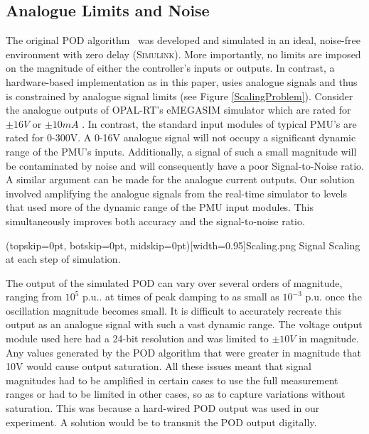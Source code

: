 \documentclass{ieeeaccess}
\begin{document}
\subsection{Analogue Limits and Noise}
The original POD algorithm~\cite{PhasorPOD} was developed and simulated in an ideal, noise-free environment with zero delay (\textsc{Simulink}). More importantly, no limits are imposed on the magnitude of either the controller's inputs or outputs. In contrast, a hardware-based implementation as in this paper, usies analogue signals and thus is constrained by analogue signal limits (see Figure \ref{ScalingProblem}). Consider the analogue outputs of OPAL-RT's eMEGASIM simulator which are rated for $\pm16V$ or $\pm10mA$  \cite{eMEGASIM}. In contrast, the standard input modules of typical PMU's are rated for 0-300V. A 0-16V analogue signal will not occupy a significant dynamic range of the PMU\rq{}s inputs. Additionally, a signal of such a small magnitude will be contaminated by noise and will consequently have a poor Signal-to-Noise ratio. A similar argument can be made for the analogue current outputs. Our solution involved amplifying the analogue signals from the real-time simulator to levels that used more of the dynamic range of the PMU input modules. This simultaneously improves both accuracy and the signal-to-noise ratio.

\Figure[tbp!](topskip=0pt, botskip=0pt, midskip=0pt)[width=0.95\columnwidth]{Scaling.png}
{Signal Scaling at each step of simulation.\label{ScalingProblem}}

The output of the simulated POD can vary over several orders of magnitude, ranging from $10^{5}$ p.u.. at times of peak damping to as small as $10^{-3}$ p.u. once the oscillation magnitude  becomes small. It is difficult to accurately recreate this output as an analogue signal with such a vast dynamic range. The voltage output module used here had a 24-bit resolution and was limited to $\pm 10V$ in magnitude. Any values generated by the POD algorithm that were greater in magnitude that 10V would cause output saturation. All these issues meant that signal magnitudes had to be amplified in certain cases to use the full measurement ranges or had to be limited in other cases, so as to capture variations without saturation. This was because a hard-wired POD output was used in our experiment. A solution would be to transmit the POD output digitally.
\end{document}
